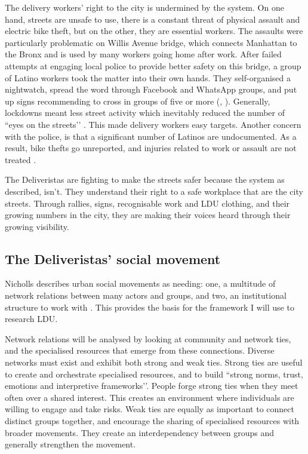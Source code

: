 \documentclass{article}[12pt]
\begin{document}
The delivery workers’ right to the city is undermined by the system. On one hand, streets are unsafe to use, there is a constant threat of physical assault and electric bike theft, but on the other, they are essential workers. 
The assaults were particularly problematic on Willis Avenue bridge, which connects Manhattan to the Bronx and is used by many workers going home after work. After failed attempts at engaging local police to provide better safety on this bridge, a group of Latino workers took the matter into their own hands. They self-organised a nightwatch, spread the word through Facebook and WhatsApp groups, and put up signs recommending to cross in groups of five or more (\parencite{vox2021}, \parencite{curbed2021}). 
Generally, lockdowns meant less street activity which inevitably reduced the number of ``eyes on the streets’’ \parencite{jacobs2007uses}. This made delivery workers easy targets.
Another concern with the police, is that a significant number of Latinos are undocumented. As a result, bike thefts go unreported, and injuries related to work or assault are not treated \parencite{brictv}.

The Deliveristas are fighting to make the streets safer because the system as described, isn't. They understand their right to a safe workplace that are the city streets. Through rallies, signs, recognisable work and LDU clothing, and their growing numbers in the city, they are making their voices heard through their growing visibility.

\subsection{The Deliveristas' social movement}

Nicholls describes urban social movements as needing: one, a multitude of network relations between many actors and groups, and two, an institutional structure to work with \parencite{nicholls2008urban}.
This provides the basis for the framework I will use to research LDU. 

Network relations will be analysed by looking at community and network ties, and the specialised resources that emerge from these connections.
Diverse networks must exist and exhibit both strong and weak ties. Strong ties are useful to create and orchestrate specialised resources, and to build ``strong norms, trust, emotions and interpretive frameworks’’\parencite{nicholls2008urban}. People forge strong ties when they meet often over a shared interest. This creates an environment where individuals are willing to engage and take risks.
Weak ties are equally as important to connect distinct groups together, and encourage the sharing of specialised resources with broader movements. They create an interdependency between groups and generally strengthen the movement.
\end{document}
